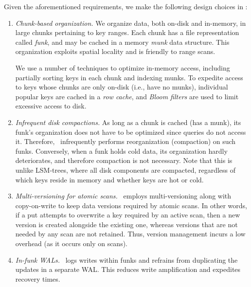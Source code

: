 
Given the aforementioned requirements, we make the following design choices in \sys:

\begin{enumerate}\itemsep0pt
\item \emph{Chunk-based organization.}
We organize data, both on-disk and in-memory,  in large chunks pertaining to  key ranges.  
Each chunk has a file representation called  \emph{funk}, and may be cached in a  memory \emph{munk} data structure.
This organization exploits spatial locality and is friendly to range scans.

We use a number of techniques to optimize in-memory  access, including partially sorting keys in each chunk and 
indexing munks. 
To expedite access to  keys whose chunks are only on-disk  (i.e., have no munks), 
individual popular keys are cached in a \emph{row cache}, 
and \emph{Bloom filters} are used to limit excessive access to disk. 

\item \emph{Infrequent disk compactions.}
As long as a chunk is cached (has a munk), its funk's organization does not have to be optimized since 
queries do not access it. Therefore, \sys\ infrequently performs reorganization (compaction) on such funks.
Conversely, when a funk holds cold data, its organization hardly deteriorates, and therefore compaction is not necessary.
Note that this is unlike LSM-trees, where all disk components are compacted, regardless of which keys reside in memory and whether 
keys are hot or cold. 

\item \emph{Multi-versioning for atomic scans.}
\sys\ employs multi-versioning along with
copy-on-write to keep data versions required by atomic scans. 
In other words, if a put attempts to overwrite a key  required by an active scan, then a new version is created alongside the 
existing one, whereas versions that are not needed by any scan are not retained. 
Thus, version management incurs a low overhead (as it occurs only on scans). 

\item \emph{In-funk WALs.}
\sys\ logs writes within funks and refrains from duplicating the updates  in a separate WAL. This reduces write amplification and expedites recovery times. 
\end{enumerate}
